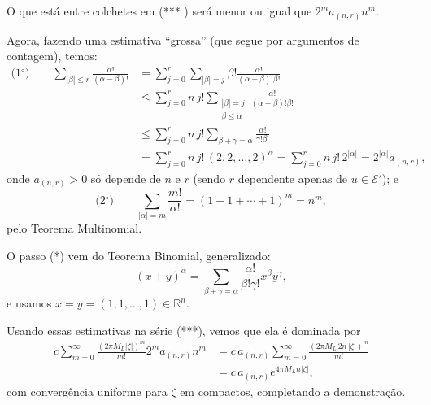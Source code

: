 \documentclass[../distribution_theory_notes.tex]{subfiles}
\begin{document}
\begin{proof*}
	\begin{tcolorbox}[
			skin=enhanced,
			title=Observação,
			fonttitle=\bfseries,
			colframe=black,
			colbacktitle=cyan!75!white,
			colback=cyan!15,
			colbacklower=black,
			coltitle=black,
			drop fuzzy shadow
		]
		O que está entre colchetes em (*** ) será menor ou igual que \(2^m a_{(n,r)}n^m.\)
	\end{tcolorbox}

	Agora, fazendo uma estimativa ``grossa'' (que segue por argumentos de contagem), temos:
	\begin{align*}
		\text{(1$^\circ$)}\qquad
		\sum_{|\beta|\leq r}\frac{\alpha!}{(\alpha-\beta)!}
		 & =\sum_{j=0}^r\sum_{|\beta|=j}
		\beta!\frac{\alpha!}{(\alpha-\beta)!\beta!}   \\
		 & \leq \sum_{j=0}^r n\,j!
		\sum_{\substack{|\beta|=j                     \\\beta\leq\alpha}}
		\frac{\alpha!}{(\alpha-\beta)!\beta!}         \\
		 & \leq \sum_{j=0}^r n\,j!
		\sum_{\beta+\gamma=\alpha}
		\frac{\alpha!}{\gamma!\beta!}                 \\
		 & =\sum_{j=0}^r n\,j!\,(2,2,\ldots,2)^\alpha
		=\sum_{j=0}^r n\,j!\,2^{|\alpha|}
		=2^{|\alpha|}a_{(n,r)},
	\end{align*}
	onde \(a_{(n,r)}>0\) só depende de \(n\) e \(r\) (sendo \(r\) dependente apenas de \(u\in\mathcal{E}'\)); e
	\[
		\text{(2$^\circ$)}\qquad
		\sum_{|\alpha|=m}\frac{m!}{\alpha!}
		=(1+1+\cdots+1)^m=n^m,
	\]
	pelo Teorema Multinomial.
	\begin{tcolorbox}[
			skin=enhanced,
			title=Observação,
			fonttitle=\bfseries,
			colframe=black,
			colbacktitle=cyan!75!white,
			colback=cyan!15,
			colbacklower=black,
			coltitle=black,
			drop fuzzy shadow
		]
		O passo (*) vem do Teorema Binomial, generalizado:
		\[
			(x+y)^\alpha=\sum_{\beta+\gamma=\alpha}\frac{\alpha!}{\beta!\gamma!}x^\beta y^\gamma,
		\]
		e usamos \(x=y=(1,1,\ldots,1)\in\mathbb{R}^n\).
	\end{tcolorbox}

	Usando essas estimativas na série (***), vemos que ela é dominada por
	\begin{align*}
		c\sum_{m=0}^\infty\frac{(2\pi M_L|\zeta|)^m}{m!}
		2^m a_{(n,r)}n^m
		 & =c\,a_{(n,r)}\sum_{m=0}^\infty
		\frac{(2\pi M_L\,2n\,|\zeta|)^m}{m!}   \\
		 & =c\,a_{(n,r)}e^{4\pi M_L n|\zeta|},
	\end{align*}
	com convergência uniforme para \(\zeta\) em compactos, completando a demonstração. \qedsymbol
\end{proof*}
\end{document}
